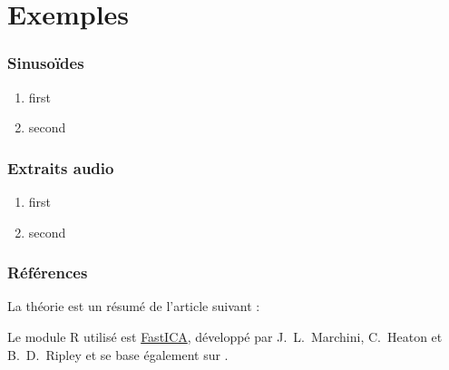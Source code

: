 \documentclass[compress]{beamer}
\begin{document}
\section{Exemples}
\begin{frame}
	\frametitle{Sinusoïdes}
	\begin{enumerate}
	\item first
	\item second
	\end{enumerate}
\end{frame}


\begin{frame}
	\frametitle{Extraits audio}
	\begin{enumerate}
	\item first
	\item second
	\end{enumerate}
\end{frame}


\appendix
\begin{frame}
	\frametitle{Références}
	La théorie est un résumé de l'article suivant :
	
	\vspace{2em}

	Le module R utilisé est
	\href{https://cran.r-project.org/web/packages/fastICA/}{FastICA},
	développé par J.~L.~Marchini, C.~Heaton et B.~D.~Ripley et
	se base également sur \cite{hyv}.
\end{frame}
\end{document}
